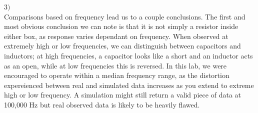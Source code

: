 \documentclass{article}
\begin{document}
\begin{flushleft}
$3)$
\\
Comparisons based on frequency lead us to a couple conclusions. The first and most obvious 
conclusion we can note is that it is not simply a resistor inside either box, as response varies 
dependant on frequency. When observed at extremely high or low frequencies, we can distinguish
between capacitors and inductors; at high frequencies, a capacitor looks like a short and an 
inductor acts as an open, while at low frequencies this is reversed. In this lab, we were 
encouraged to operate within a median frequency range, as the distortion expereienced between 
real and simulated data increases as you extend to extreme high or low frequency. A simulation 
might still return a valid piece of data at 100,000 Hz but real observed data is likely to 
be heavily flawed. 
\end{flushleft}

\end{document}
